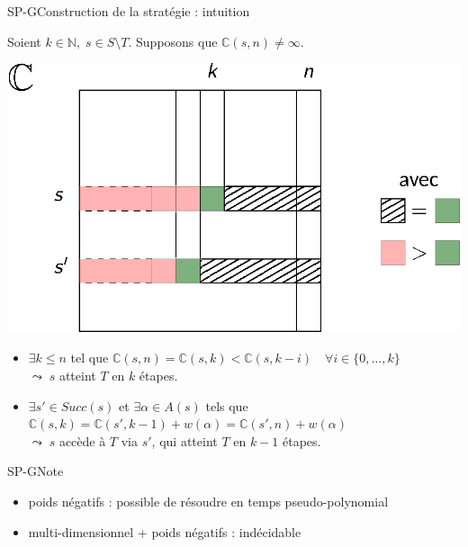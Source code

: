 \documentclass[compress]{beamer}
\begin{document}
\begin{frame}{SP-G}{Construction de la stratégie : intuition}
\small

Soient $k \in \mathbb{N}, \; s \in S \setminus T$. Supposons que $\mathbb{C}(s, n) \neq \infty$.
\begin{center}
  \includegraphics[width=0.5\linewidth]{resources/sp-proof}
\end{center}
\begin{itemize}
  \item $\exists k \leq n$ tel que
$ \mathbb{C}(s, n) = \mathbb{C}(s, k) < \mathbb{C}(s, k-i) \quad \forall i \in \{0, \dots, k\}$ \\
  $\leadsto \; s$ atteint $T$ en $k$ étapes.
  \item $\exists s' \in Succ(s)$ et $\exists \alpha \in A(s)$ tels que $\mathbb{C}(s, k) = \mathbb{C}(s', k-1) + w(\alpha) = \mathbb{C}(s', n) + w(\alpha)$\\
  $\leadsto \; s$ accède à $T$ via $s'$, qui atteint $T$ en $k-1$ étapes.
\end{itemize}

\end{frame}

\begin{frame}{SP-G}{Note}
  \begin{itemize}
    \item poids négatifs : \alert{possible de résoudre en temps pseudo-polynomial}
    \item multi-dimensionnel + poids négatifs : \alert{indécidable}
  \end{itemize}
\end{frame}
\end{document}

